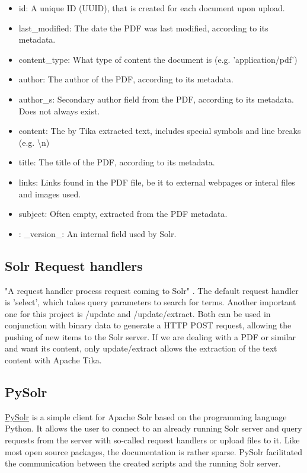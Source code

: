 \documentclass[a4paper,12pt]{article}
\begin{document}
\begin{itemize}
    \item id: A unique ID (UUID), that is created for each document upon upload.
    \item last\_modified: The date the PDF was last modified, according to its metadata.
    \item content\_type: What type of content the document is (e.g. 'application/pdf')
    \item author: The author of the PDF, according to its metadata.
    \item author\_s: Secondary author field from the PDF, according to its metadata. Does not always exist.
    \item content: The by Tika extracted text, includes special symbols and line breaks (e.g. \textbackslash n)
    \item title: The title of the PDF, according to its metadata.
    \item links: Links found in the PDF file, be it to external webpages or interal files and images used.
    \item subject: Often empty, extracted from the PDF metadata.
    \item: \_version\_: An internal field used by Solr.
\end{itemize}


\subsection{Solr Request handlers}
"A request handler process request coming to Solr" \cite{apache_solr_reference_guide_requesthandlers}. 
The default request handler is 'select', which takes query parameters to search for terms.
Another important one for this project is /update and /update/extract. 
Both can be used in conjunction with binary data to generate a HTTP POST request, allowing the pushing of new items to the Solr server.
If we are dealing with a PDF or similar and want its content, only update/extract allows the extraction of the text content with Apache Tika.


\subsection{PySolr}
\href{https://pypi.org/project/pysolr/}{PySolr} is a simple client for Apache Solr based on the programming language Python. 
It allows the user to connect to an already running Solr server and query requests from the server with so-called request handlers or upload files to it. 
Like most open source packages, the documentation is rather sparse. 
PySolr facilitated the communication between the created scripts and the running Solr server.
\end{document}

